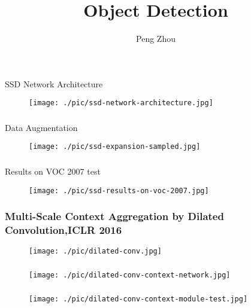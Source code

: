 \documentclass{beamer}
\begin{document}
\title{Object Detection}
\author{Peng Zhou}
\maketitle{}


\begin{frame}
  \frametitle{}
  SSD Network Architecture
  \begin{figure}[!htb]
    \centering
    \texttt{[image: ./pic/ssd-network-architecture.jpg]}
  \end{figure}
\end{frame}

\begin{frame}
  \frametitle{}
  Data Augmentation
  \begin{figure}[!htb]
    \centering
    \texttt{[image: ./pic/ssd-expansion-sampled.jpg]}
  \end{figure}
\end{frame}

\begin{frame}
  \frametitle{}
  Results on VOC 2007 test
  \begin{figure}[!htb]
    \centering
    \texttt{[image: ./pic/ssd-results-on-voc-2007.jpg]}
  \end{figure}
\end{frame}


\begin{frame}
  \frametitle{Multi-Scale Context Aggregation by Dilated Convolution,ICLR 2016}
\begin{figure}[!htb]
  \centering
  \texttt{[image: ./pic/dilated-conv.jpg]}
\end{figure}
\end{frame}

\begin{frame}
  \frametitle{}
  \begin{figure}[!htb]
    \centering
    \texttt{[image: ./pic/dilated-conv-context-network.jpg]}
  \end{figure}
\end{frame}

\begin{frame}
  \frametitle{}
  \begin{figure}[!htb]
    \centering
    \texttt{[image: ./pic/dilated-conv-context-module-test.jpg]}
  \end{figure}
\end{frame}
\end{document}
